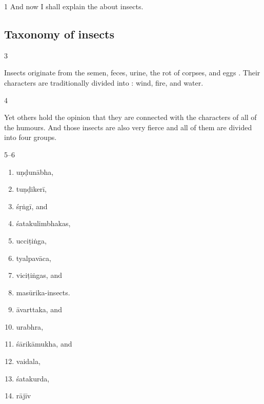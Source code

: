 \begin{translation}

\item[1]
 And now I shall explain the  about 
 insects.
 
 


\subsection{Taxonomy of insects}


\item [3] 

Insects originate from the semen, feces, urine, the rot of corpses,
and eggs .  Their
characters are traditionally divided
into : wind, fire, and water.

\item[4]

Yet others hold the opinion that they are connected with the
characters of all of the humours. And those
insects are also very fierce and all of them are divided into four
groups.

\item[5--6]
\begin{multicols}{2}
\begin{enumerate}
    \item \Gls{uṇḍunābha},
    \item \gls{tuṇḍikerī},
    \item \gls{śṛṅgī}, and
    \item \glspl{śatakulimbhaka},
    \item \gls{ucciṭiṅga},
    \item \gls{tyalpavāca},
    \item \glspl{viciṭiṅga},
    and
    \item \glspl{masūrika-insect}.
    \item \Gls{āvarttaka}, and
    \item \gls{urabhra},
    \item \gls{śārikāmukha}, and
    \item \gls{vaidala},
    \item \gls{śatakurda},
    \item \gls{rājīv}
\end{enumerate}
\end{multicols}




\end{translation}
